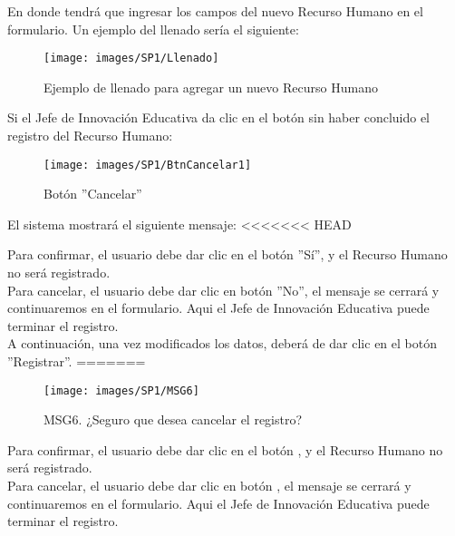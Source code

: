         En donde tendrá que ingresar los campos del nuevo Recurso Humano en el formulario. Un ejemplo del llenado sería el siguiente:

        \begin{figure}[!hbtp]
            \centering
            \hypertarget{ejreg}{\texttt{[image: images/SP1/Llenado]}}
            \caption{Ejemplo de llenado para agregar un nuevo Recurso Humano}
            \label{ejreg}
        \end{figure}
        \newpage
        Si el Jefe de Innovación Educativa da clic en el botón  sin haber concluido el registro del Recurso Humano:

        \begin{figure}[!hbtp]
            \centering
            \hypertarget{cancel1}{\texttt{[image: images/SP1/BtnCancelar1]}}
            \caption{Botón ''Cancelar''}
            \label{cancel1}
        \end{figure}

        El sistema mostrará el siguiente mensaje:
<<<<<<< HEAD

        Para confirmar, el usuario debe dar clic en el botón ''Sí'', y el Recurso Humano no será registrado.\\

        Para cancelar, el usuario debe dar clic en botón ''No'', el mensaje se cerrará y continuaremos en el formulario. Aqui el Jefe de Innovación Educativa puede terminar el registro.\\

        A continuación, una vez modificados los datos, deberá de dar clic en el botón ''Registrar''.
=======
        \begin{figure}[!hbtp]
                \centering
                \hypertarget{buscar}{\texttt{[image: images/SP1/MSG6]}}
                \caption{MSG6. ¿Seguro que desea cancelar el registro?}
                \label{buscar}
        \end{figure}
        
        Para confirmar, el usuario debe dar clic en el botón , y el Recurso Humano no será registrado.\\
        
        Para cancelar, el usuario debe dar clic en botón , el mensaje se cerrará y continuaremos en el formulario. Aqui el Jefe de Innovación Educativa puede terminar el registro.\\
        

